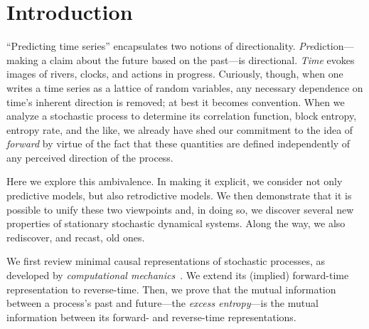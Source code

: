 %

\maketitle




\section{Introduction}

``Predicting time series'' encapsulates two notions of directionality.
\emph{Pre}diction---making a claim about the future based on the past---is
directional. \emph{Time} evokes images of rivers, clocks, and actions in
progress. Curiously, though, when one writes a time series as a lattice of
random variables, any necessary dependence on time's inherent direction is
removed; at best it becomes convention. When we analyze a stochastic process to
determine its correlation function, block entropy, entropy rate, and the like,
we already have shed our commitment to the idea of \emph{forward} by virtue of
the fact that these quantities are defined independently of any perceived
direction of the process.

Here we explore this ambivalence. In making it explicit, we consider not only
predictive models, but also retrodictive models. We then demonstrate that it
is possible to unify these two viewpoints and, in doing so, we discover
several new properties of stationary stochastic dynamical systems. Along the
way, we also rediscover, and recast, old ones.

We first review minimal causal representations of stochastic processes, as
developed by \emph{computational mechanics}~\cite{Crut88a,Crut98d}. We extend
its (implied) forward-time representation to reverse-time. Then, we prove that
the mutual information between a process's past and future---the
\emph{excess entropy}---is the mutual information between its
forward- and reverse-time representations.

